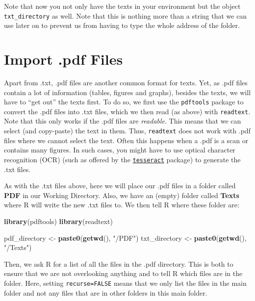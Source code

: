 \documentclass[
]{book}
\newenvironment{Shaded}{\begin{snugshade}}{\end{snugshade}}
\newcommand{\FunctionTok}[1]{\textcolor[rgb]{0.13,0.29,0.53}{\textbf{#1}}}
\newcommand{\NormalTok}[1]{#1}
\newcommand{\OtherTok}[1]{\textcolor[rgb]{0.56,0.35,0.01}{#1}}
\newcommand{\StringTok}[1]{\textcolor[rgb]{0.31,0.60,0.02}{#1}}
\begin{document}
Note that now you not only have the texts in your environment but the object \texttt{txt\_directory} as well. Note that this is nothing more than a string that we can use later on to prevent us from having to type the whole address of the folder.

\section{Import .pdf Files}\label{import-.pdf-files}

Apart from .txt, .pdf files are another common format for texts. Yet, as .pdf files contain a lot of information (tables, figures and graphs), besides the texts, we will have to ``get out'' the texts first. To do so, we first use the \texttt{pdftools} package to convert the .pdf files into .txt files, which we then read (as above) with \texttt{readtext}. Note that this only works if the .pdf files are \emph{readable}. This means that we can select (and copy-paste) the text in them. Thus, \texttt{readtext} does not work with .pdf files where we cannot select the text. Often this happens when a .pdf is a scan or contains many figures. In such cases, you might have to use optical character recognition (OCR) (such as offered by the \href{https://github.com/tesseract-ocr/tesseract}{\texttt{tesseract}} package) to generate the .txt files.

As with the .txt files above, here we will place our .pdf files in a folder called \textbf{PDF} in our Working Directory. Also, we have an (empty) folder called \textbf{Texts} where R will write the new .txt files to. We then tell R where these folder are:

\begin{Shaded}
\begin{Highlighting}[]
\FunctionTok{library}\NormalTok{(pdftools)}
\FunctionTok{library}\NormalTok{(readtext)}

\NormalTok{pdf\_directory }\OtherTok{\textless{}{-}} \FunctionTok{paste0}\NormalTok{(}\FunctionTok{getwd}\NormalTok{(), }\StringTok{"/PDF"}\NormalTok{)}
\NormalTok{txt\_directory }\OtherTok{\textless{}{-}} \FunctionTok{paste0}\NormalTok{(}\FunctionTok{getwd}\NormalTok{(), }\StringTok{"/Texts"}\NormalTok{)}
\end{Highlighting}
\end{Shaded}

Then, we ask R for a list of all the files in the .pdf directory. This is both to ensure that we are not overlooking anything and to tell R which files are in the folder. Here, setting \texttt{recurse=FALSE} means that we only list the files in the main folder and not any files that are in other folders in this main folder.
\end{document}
